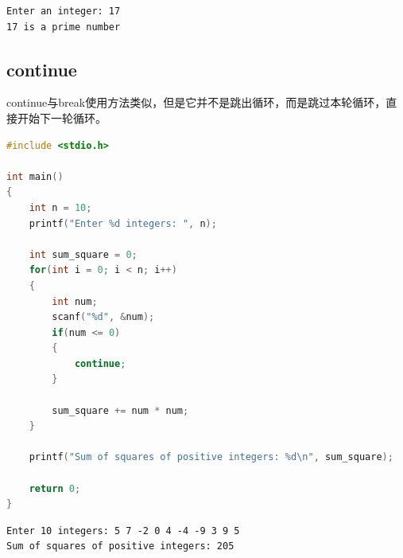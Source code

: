 \begin{tcolorbox}
    \begin{verbatim}
Enter an integer: 17
17 is a prime number
\end{verbatim}
\end{tcolorbox}

\vspace{0.5cm}

\subsection{continue}

continue与break使用方法类似，但是它并不是跳出循环，而是跳过本轮循环，直接开始下一轮循环。\\


\begin{lstlisting}[language=C]
#include <stdio.h>

int main()
{
    int n = 10;
    printf("Enter %d integers: ", n);

    int sum_square = 0;
    for(int i = 0; i < n; i++)
    {
        int num;
        scanf("%d", &num);
        if(num <= 0)
        {
            continue;
        }

        sum_square += num * num;
    }

    printf("Sum of squares of positive integers: %d\n", sum_square);

    return 0;
}
\end{lstlisting}

\begin{tcolorbox}
    \begin{verbatim}
Enter 10 integers: 5 7 -2 0 4 -4 -9 3 9 5
Sum of squares of positive integers: 205
\end{verbatim}
\end{tcolorbox}

\newpage